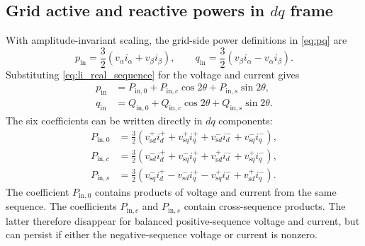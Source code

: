 \subsection{Grid active and reactive powers in \(dq\) frame}
With amplitude-invariant scaling, the grid-side power definitions in \eqref{eq:pq} are
\begin{equation}\label{eq:li_pq_real}
p_{\mathrm{in}}=\frac32(v_\alpha i_\alpha+v_\beta i_\beta),\qquad
q_{\mathrm{in}}=\frac32(v_\beta i_\alpha-v_\alpha i_\beta).
\end{equation}
Substituting \eqref{eq:li_real_sequence} for the voltage and current gives
\begin{equation}\label{eq:li_grid_pq_ripple}
\begin{aligned}
p_{\mathrm{in}}&=P_{\mathrm{in},0}+P_{\mathrm{in},c}\cos2\theta+P_{\mathrm{in},s}\sin2\theta,\\
q_{\mathrm{in}}&=Q_{\mathrm{in},0}+Q_{\mathrm{in},c}\cos2\theta+Q_{\mathrm{in},s}\sin2\theta .
\end{aligned}
\end{equation}
The six coefficients can be written directly in \(dq\) components:
\begin{equation}\label{eq:li_grid_P_real}
\begin{aligned}
P_{\mathrm{in},0}&=\frac32(v_{\mathrm{s}d}^+i_d^++v_{\mathrm{s}q}^+i_q^+
                  +v_{\mathrm{s}d}^-i_d^-+v_{\mathrm{s}q}^-i_q^-),\\
P_{\mathrm{in},c}&=\frac32(v_{\mathrm{s}d}^-i_d^++v_{\mathrm{s}q}^-i_q^+
                  +v_{\mathrm{s}d}^+i_d^-+v_{\mathrm{s}q}^+i_q^-),\\
P_{\mathrm{in},s}&=\frac32(v_{\mathrm{s}q}^-i_d^+-v_{\mathrm{s}d}^-i_q^+
                  -v_{\mathrm{s}q}^+i_d^-+v_{\mathrm{s}d}^+i_q^-).
\end{aligned}
\end{equation}
The coefficient \(P_{\mathrm{in},0}\) contains products of voltage and current from the same sequence. The coefficients \(P_{\mathrm{in},c}\) and \(P_{\mathrm{in},s}\) contain cross-sequence products. The latter therefore disappear for balanced positive-sequence voltage and current, but can persist if either the negative-sequence voltage or current is nonzero.

